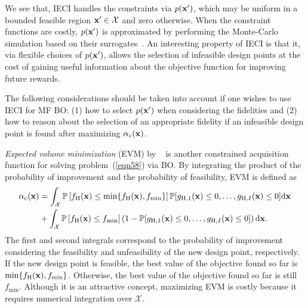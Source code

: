 \documentclass[journal ]{new-aiaa}
\begin{document}
	We see that, IECI handles the constraints via $p({\bf x'})$, which may be uniform in a bounded feasible region ${\bf x'} \in \mathcal{X}$ and zero otherwise.
	When the constraint functions are costly, $p({\bf x'})$ is approximated by performing the Monte-Carlo simulation based on their surrogates~\citep{Gramacy2011}.
	An interesting property of IECI is that it, via flexible choices of $p({\bf x'})$, allows the selection of infeasible design points at the cost of gaining useful information about the objective function for improving future rewards.
	
	The following considerations should be taken into account if one wishes to use IECI for MF BO: (1) how to select $p({\bf x'})$ when considering the fidelities and (2) how to reason about the selection of an appropriate fidelity if an infeasible design point is found after maximizing $\alpha_\text{c}({\bf x})$.  
	
	\textit{Expected volume minimization} (EVM) by ~\citet{Picheny2014} is another constrained acquisition function for solving problem~(\ref{eqn58}) via BO.
	By integrating the product of the probability of improvement and the probability of feasibility, EVM is defined as
	\begin{equation}\label{eqn62}          
		\begin{aligned}
			\alpha_\text{c}({\bf x}) & = \int_{\mathcal{X}} \mathbb{P}\left[f_\text{H}({\bf x}) \leq \min\{f_\text{H}({\bf x}),f_{\min}\}\right] 
			\mathbb{P}[g_{\text{H},1}({\bf x}) \leq 0,\dots,g_{\text{H},I}({\bf x}) \leq 0] \text{d}{\bf x}  \\
			& + \int_{\mathcal{X}} \mathbb{P}\left[f_\text{H}({\bf x}) \leq f_{\min}\right]
			\left(1-\mathbb{P}[g_{\text{H},1}({\bf x}) \leq 0,\dots,g_{\text{H},I}({\bf x}) \leq 0]\right) \text{d}{\bf x}.
		\end{aligned} 
	\end{equation}
	The first and second integrals correspond to the probability of improvement considering the feasibility and unfeasibility of the new design point, respectively.
	If the new design point is feasible, the best value of the objective found so far is $\min\{f_\text{H}({\bf x}),f_{\min}\}$.
	Otherwise, the best value of the objective found so far is still $f_{\min}$.
	Although it is an attractive concept, maximizing EVM is costly because it requires numerical integration over $\mathcal{X}$.
	
\end{document}

